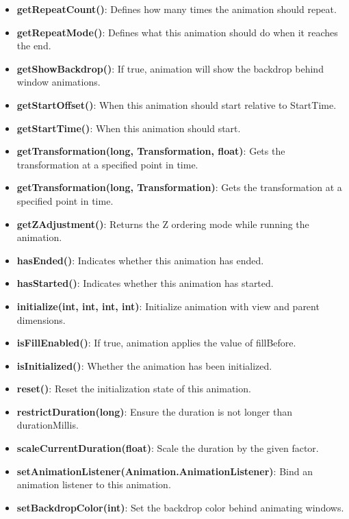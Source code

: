\documentclass{report}
\begin{document}
\begin{itemize}
\begin{itemize}
                \item \textbf{getRepeatCount()}: Defines how many times the animation should repeat.
                \item \textbf{getRepeatMode()}: Defines what this animation should do when it reaches the end.
                \item \textbf{getShowBackdrop()}: If true, animation will show the backdrop behind window animations.
                \item \textbf{getStartOffset()}: When this animation should start relative to StartTime.
                \item \textbf{getStartTime()}: When this animation should start.
                \item \textbf{getTransformation(long, Transformation, float)}: Gets the transformation at a specified point in time.
                \item \textbf{getTransformation(long, Transformation)}: Gets the transformation at a specified point in time.
                \item \textbf{getZAdjustment()}: Returns the Z ordering mode while running the animation.
                \item \textbf{hasEnded()}: Indicates whether this animation has ended.
                \item \textbf{hasStarted()}: Indicates whether this animation has started.
                \item \textbf{initialize(int, int, int, int)}: Initialize animation with view and parent dimensions.
                \item \textbf{isFillEnabled()}: If true, animation applies the value of fillBefore.
                \item \textbf{isInitialized()}: Whether the animation has been initialized.
                \item \textbf{reset()}: Reset the initialization state of this animation.
                \item \textbf{restrictDuration(long)}: Ensure the duration is not longer than durationMillis.
                \item \textbf{scaleCurrentDuration(float)}: Scale the duration by the given factor.
                \item \textbf{setAnimationListener(Animation.AnimationListener)}: Bind an animation listener to this animation.
                \item \textbf{setBackdropColor(int)}: Set the backdrop color behind animating windows.

\end{itemize}
\end{itemize}
\end{document}
